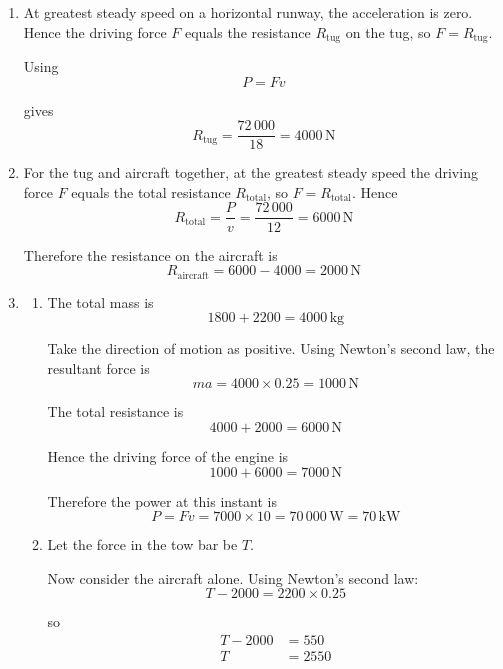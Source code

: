 \documentclass[leqno]{article}
\begin{document}
\begin{enumerate}[
  label=\textbf{\arabic*.},
  leftmargin=*,
  topsep=0pt,
  partopsep=0pt,
  parsep=0pt
]
\vspace*{10pt}

\begin{djsSolution}
\begin{enumerate}[label=\textbf{(\roman*)}, start=1]
  \item At greatest steady speed on a horizontal runway, the acceleration is zero. Hence the driving force \(F\) equals the resistance \(R_{\text{tug}}\) on the tug, so \(F=R_{\text{tug}}\).

  Using
  \[
  P = Fv
  \]

  gives
  \[
  R_{\text{tug}} = \frac{72\,000}{18} = 4000\,\mathrm{N}
  \]

  \item For the tug and aircraft together, at the greatest steady speed the driving force \(F\) equals the total resistance \(R_{\text{total}}\), so \(F=R_{\text{total}}\). Hence
  \[
  R_{\text{total}} = \frac{P}{v} = \frac{72\,000}{12} = 6000\,\mathrm{N}
  \]

  Therefore the resistance on the aircraft is
  \[
  R_{\text{aircraft}} = 6000 - 4000 = 2000\,\mathrm{N}
  \]

  \item
  \begin{enumerate}[label=\textbf{(\alph*)}, start=1]
    \item The total mass is
    \[
    1800 + 2200 = 4000\,\mathrm{kg}
    \]

    Take the direction of motion as positive. Using Newton's second law, the resultant force is
    \[
    ma = 4000 \times 0.25 = 1000\,\mathrm{N}
    \]

    The total resistance is
    \[
    4000 + 2000 = 6000\,\mathrm{N}
    \]

    Hence the driving force of the engine is
    \[
    1000 + 6000 = 7000\,\mathrm{N}
    \]

    Therefore the power at this instant is
    \[
    P = Fv = 7000 \times 10 = 70\,000\,\mathrm{W} = 70\,\mathrm{kW}
    \]

    \item Let the force in the tow bar be \(T\).

    Now consider the aircraft alone. Using Newton's second law:
    \[
    T - 2000 = 2200 \times 0.25
    \]

    so
    \begin{align*}
    T - 2000 &= 550 \\
    T &= 2550
    \end{align*}


\end{enumerate}
\end{enumerate}
\end{djsSolution}
\end{enumerate}
\end{document}
